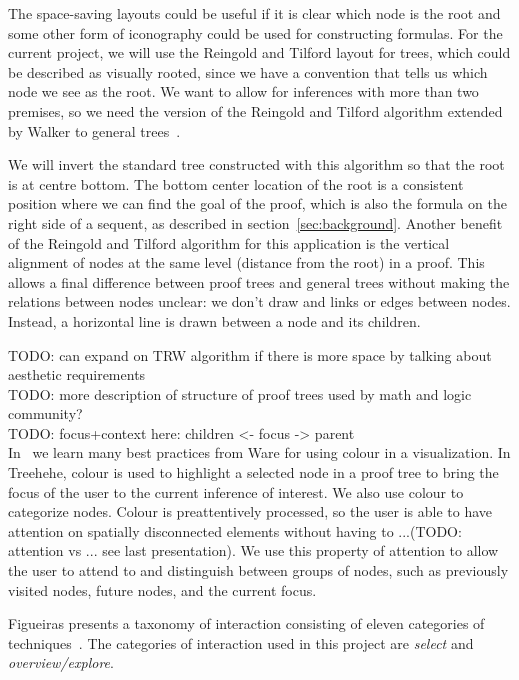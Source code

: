 \documentclass[conference]{IEEEtran}
\newcommand{\projectname}{Treehehe}
\begin{document}
The space-saving layouts could be useful if it is clear which node is the root and some other form of iconography could be used for constructing formulas. For the current project, we will use the Reingold and Tilford layout for trees, which could be described as visually rooted, since we have a convention that tells us which node we see as the root. We want to allow for inferences with more than two premises, so we need the version of the Reingold and Tilford algorithm extended by Walker to general trees~\cite{generaltreeslayout-walker}.

We will invert the standard tree constructed with this algorithm so that the root is at centre bottom. The bottom center location of the root is a consistent position where we can find the goal of the proof, which is also the formula on the right side of a sequent, as described in section~\ref{sec:background}. Another benefit of the Reingold and Tilford algorithm for this application is the vertical alignment of nodes at the same level (distance from the root) in a proof. This allows a final difference between proof trees and general trees without making the relations between nodes unclear: we don't draw and links or edges between nodes. Instead, a horizontal line is drawn between a node and its children.

TODO: can expand on TRW algorithm if there is more space by talking about aesthetic requirements \\

TODO: more description of structure of proof trees used by math and logic community? \\

TODO: focus+context here: children <- focus -> parent \\

In~\cite{infovis-ware} we learn many best practices from Ware for using colour in a visualization. In \projectname{}, colour is used to highlight a selected node in a proof tree to bring the focus of the user to the current inference of interest. We also use colour to categorize nodes. Colour is preattentively processed, so the user is able to have attention on spatially disconnected elements without having to ...(TODO: attention vs ... see last presentation). We use this property of attention to allow the user to attend to and distinguish between groups of nodes, such as previously visited nodes, future nodes, and the current focus.

Figueiras presents a taxonomy of interaction consisting of eleven categories of techniques~\cite{interaction-figueiras}. The categories of interaction used in this project are \textit{select} and \textit{overview/explore}.
\end{document}
